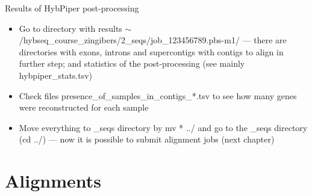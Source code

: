 \documentclass[compress,  xelatex, 11pt, xcolor=x11names, aspectratio=169,
	hyperref={
		bookmarks=true,
		unicode=true,
		colorlinks=true,
		pdftitle={HybSeq course},
		plainpages=false,
		pdfauthor={Vojtech Zeisek},
		pdfsubject={Practical processing of HybSeq target enrichment sequencing data on computing grids like MetaCentrum},
		pdfcreator={XeLaTeX},
		pdfkeywords={BASH, command line, GNU, HybSeq, Linux, MetaCentrum, sequencing shell, target enrichment},
		linkcolor=Turquoise4, %
		anchorcolor=DodgerBlue4, %
		citecolor=DodgerBlue4, %
		filecolor=DodgerBlue4, %
		menucolor=Tan4, %
		urlcolor=DarkOliveGreen4 %
		},
	url={hyphens, lowtilde} %
	]{beamer}
\renewcommand{\texttt}[1]{\colorbox{Cornsilk2}{{\ttfamily #1}}}
\begin{document}
\begin{frame}{Results of HybPiper post-processing}
	\begin{itemize}
		\item Go to directory with results \texttt{$\sim$/hybseq\_course\_zingibers/2\_seqs/job\_123456789.pbs-m1/} --- there are directories with exons, introns and supercontigs with contigs to align in further step; and statistics of the post-processing (see mainly \texttt{hybpiper\_stats.tsv})
		\item Check files \texttt{presence\_of\_samples\_in\_contigs\_*.tsv} to see how many genes were reconstructed for each sample
		\item Move everything to \texttt{2\_seqs} directory by \texttt{mv * ../} and go to the \texttt{2\_seqs} directory (\texttt{cd ../}) --- now it is possible to submit alignment jobs (next chapter)
	\end{itemize}
\end{frame}

\section{Alignments}
\end{document}
